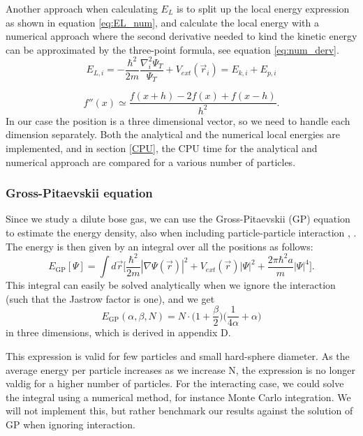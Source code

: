 \documentclass[norsk,a4paper,12pt]{article}
\begin{document}
Another approach when calculating $E_L$ is to split up the local energy expression as shown in equation \ref{eq:EL_num}, and calculate the local energy with a numerical approach where the second derivative needed to kind the kinetic energy can be approximated by the three-point formula, see equation \ref{eq:num_derv}.
\begin{equation}
\label{eq:EL_num}
E_{L,i}=-\frac{\hbar^2}{2m}\frac{\nabla_i^2\Psi_T}{\Psi_T}+V_{ext}(\vec{r}_i)=E_{k,i}+E_{p,i}
\end{equation}

\begin{equation}
\label{eq:num_derv}
f''(x)\simeq\frac{f(x+h)-2f(x)+f(x-h)}{h^2}.
\end{equation}
In our case the position is a three dimensional vector, so we need to handle each dimension separately. Both the analytical and the numerical local energies are implemented, and in section \ref{CPU}, the CPU time for the analytical and numerical approach are compared for a various number of particles.
 

\subsubsection{Gross-Pitaevskii equation}
Since we study a dilute bose gas, we can use the Gross-Pitaevskii (GP) equation to estimate the energy density, also when including particle-particle interaction \cite{Gross}, \cite{Pitaevskii}. The energy is then given by an integral over all the positions \cite{Nilsen} as follows:
\begin{equation}
E_{\text{GP}}[\Psi]=\int d\vec{r}\bigg[\frac{\hbar^2}{2m}|\nabla\Psi(\vec{r})|^2+V_{ext}(\vec{r})|\Psi|^2+\frac{2\pi\hbar^2a}{m}|\Psi|^4\bigg].
\label{eq:GP_integral}
\end{equation}
This integral can easily be solved analytically when we ignore the interaction (such that the Jastrow factor is one), and we get
\begin{equation}
\label{eq:GP}
E_{\text{GP}}(\alpha, \beta, N)=N\cdot\bigg(1+\frac{\beta}{2}\bigg)\bigg(\frac{1}{4\alpha}+\alpha\bigg)
\end{equation}
in three dimensions, which is derived in appendix D.

This expression is valid for few particles and small hard-sphere diameter. As the average energy per particle  increases as we increase N, the expression is no longer valdig for a higher number of particles. For the interacting case, we could solve the integral using a numerical method, for instance Monte Carlo integration. We will not implement this, but rather benchmark our results against the solution of GP when ignoring interaction.
\end{document}
